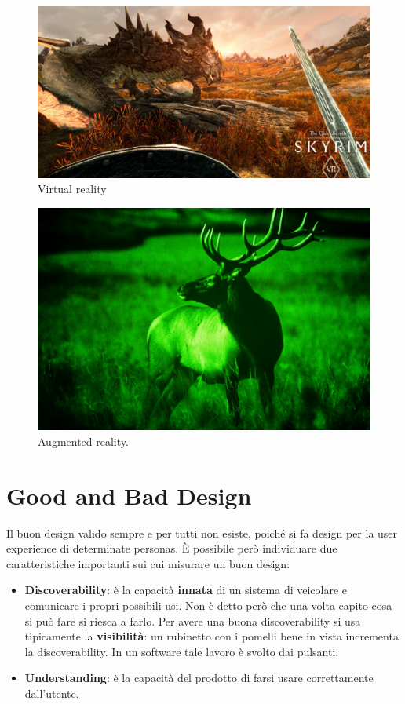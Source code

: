 \documentclass[a4paper,11pt,oneside]{book}
\begin{document}
\begin{figure}[!h]
	\centering
	\includegraphics[scale = 0.15]{immagini/SkyrymVR.png}
	\caption{Virtual reality}
\end{figure}\begin{figure}[!h]
	\centering
	\includegraphics[scale = 0.15]{immagini/Night_vision.jpeg}
	\caption{Augmented reality.}
\end{figure}

\pagebreak


\chapter{Good and Bad Design}
Il buon design valido sempre e per tutti non esiste, poiché si fa design per la user experience di determinate personas. È possibile però individuare due caratteristiche importanti sui cui misurare un buon design:

\begin{itemize}
	\item \textbf{Discoverability}: è la capacità \textbf{innata} di un sistema di veicolare e comunicare i propri possibili usi. Non è detto però che una volta capito cosa si può fare si riesca a farlo. Per avere una buona discoverability si usa tipicamente la \textbf{visibilità}: un rubinetto con i pomelli bene in vista incrementa la discoverability. In un software tale lavoro è svolto dai pulsanti.
	\item \textbf{Understanding}: è la capacità del prodotto di farsi usare correttamente dall'utente.
\end{itemize}
\end{document}
